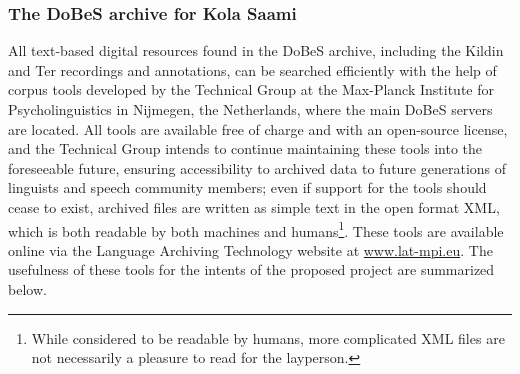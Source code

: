 \documentclass[a4paper,12pt]{article}
\begin{document}
\subsubsection{The DoBeS archive for Kola Saami}%

All text-based digital resources found in the DoBeS archive, including the Kildin and Ter recordings and annotations, can be searched efficiently with the help of corpus tools developed by the Technical Group at the Max-Planck Institute for Psycholinguistics in Nijmegen, the Netherlands, where the main DoBeS servers are located. All tools are available free of charge and with an open-source license, and the Technical Group intends to continue maintaining these tools into the foreseeable future, ensuring accessibility to archived data to future generations of linguists and speech community members; even if support for the tools should cease to exist, archived files are written as simple text in the open format XML, which is both readable by both machines and humans\footnote{While considered to be readable by humans, more complicated XML files are not necessarily a pleasure to read for the layperson.}. These tools are available online via the Language Archiving Technology website at \url{www.lat-mpi.eu}.%
The usefulness of these tools for the intents of the proposed project are summarized below.
\end{document}
